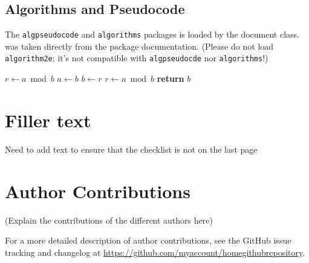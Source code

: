 \documentclass[9pt,bestpractices]{livecoms}
\newcommand{\githubrepository}{\url{https://github.com/myaccount/homegithubrepository}}  %
\begin{document}
\subsection{Algorithms and Pseudocode}
\label{sec:reference_this}

The \texttt{algpseudocode} and \texttt{algorithms} packages is loaded by the document class.  was taken directly from the package documentation. (Please do not load \texttt{algorithm2e}; it's not compatible with \texttt{algpseudocde} nor \texttt{algorithms}!)

\begin{algorithm}
\caption{Euclid's algorithm}\label{alg:euclid}
\begin{algorithmic}%
   \State $r\gets a\bmod b$
      \State $a\gets b$
      \State $b\gets r$
      \State $r\gets a\bmod b$
   \EndWhile\label{euclidendwhile}
   \State \textbf{return} $b$
\EndProcedure
\end{algorithmic}
\end{algorithm}

\section{Filler text}
Need to add text to ensure that the checklist is not on the last page

\lipsum[1-6]




\section{Author Contributions}
%

(Explain the contributions of the different authors here)

For a more detailed description of author contributions,
see the GitHub issue tracking and changelog at \githubrepository.
\end{document}
